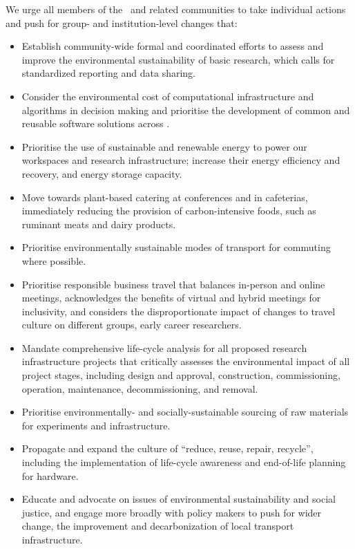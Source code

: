 \documentclass[../SustainableHEP.tex]{subfiles}
\begin{document}
We urge all members of the \ACR\ and related communities to take individual actions and push for group- and institution-level changes that:
\begin{itemize}
    \item Establish community-wide formal and coordinated efforts to assess and improve the environmental sustainability of basic research, which calls for standardized reporting and data sharing.
      \item Consider the environmental cost of computational infrastructure and algorithms in decision making and prioritise the development of common and reusable software solutions across \ACR.
     \item Prioritise the use of sustainable and renewable energy to power our workspaces and research infrastructure; increase their energy efficiency and recovery, and energy storage capacity.
    \item Move towards plant-based catering at conferences and in cafeterias, immediately reducing the provision of carbon-intensive foods, such as ruminant meats and dairy products.
    \item Prioritise environmentally sustainable modes of transport for commuting where possible.
    \item Prioritise responsible business travel that balances in-person and online meetings, acknowledges the benefits of virtual and hybrid meetings for inclusivity, and considers the disproportionate impact of changes to travel culture on different groups, \eg early career researchers.
    \item Mandate comprehensive life-cycle analysis for all proposed research infrastructure projects that critically assesses the environmental impact of all project stages, including design and approval, construction, commissioning, operation, maintenance, decommissioning, and removal.
     \item Prioritise environmentally- and socially-sustainable sourcing of raw materials for experiments and infrastructure.
     \item Propagate and expand the culture of ``reduce, reuse, repair, recycle'', including the implementation of life-cycle awareness and end-of-life planning for hardware.
    \item Educate and advocate on issues of environmental sustainability and social justice,  and engage more broadly with policy makers to push for wider change, \eg the improvement and decarbonization of local transport infrastructure.
\end{itemize}
\end{document}
